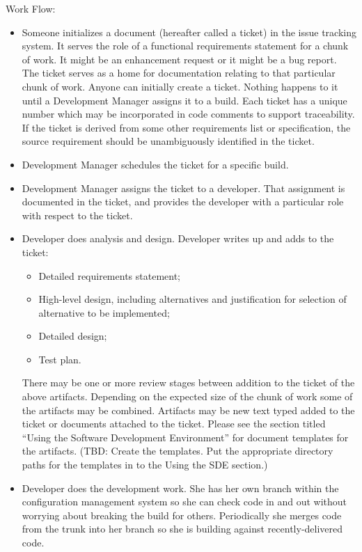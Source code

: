 Work Flow:
\begin{itemize}
\item
Someone initializes a document (hereafter called a ticket) in the 
issue tracking system.  It serves the role of a functional requirements 
statement for a chunk of work.  It might be an enhancement request or 
it might be a bug report.  The ticket serves as a home for 
documentation relating to that particular chunk of work.  Anyone can 
initially create a ticket.  Nothing happens to it until a 
Development Manager assigns it to a build.  Each ticket has a unique
number which may be incorporated in code comments to support 
traceability.  If the ticket is derived from some other requirements
list or specification, the source requirement should be unambiguously
identified in the ticket.
\item
Development Manager schedules the ticket for a specific build.
\item
Development Manager assigns the ticket to a developer.  That 
assignment is documented in the ticket, and provides the developer 
with a particular role with respect to the ticket.
\item
Developer does analysis and design.  Developer writes up and adds 
to the ticket:
\begin{itemize}
\item
Detailed requirements statement; 
\item
High-level design, including alternatives and justification for 
selection of alternative to be implemented; 
\item
Detailed design;
\item
Test plan.
\end{itemize}
There may be one or more review stages between addition to the 
ticket of the above artifacts.  Depending on the expected size 
of the chunk of work some of the artifacts may be combined.  
Artifacts may be new text typed added to the ticket or 
documents attached to the ticket.  Please see the section
titled ``Using the Software Development Environment'' for
document templates for the artifacts.  (TBD:  Create the
templates.  Put the appropriate directory paths for the
templates in to the Using the SDE section.)
\item
Developer does the development work.  She has her own branch 
within the configuration management system so she can check 
code in and out without worrying about breaking the build for 
others.  Periodically she merges code from the trunk into her 
branch so she is building against recently-delivered code.


\end{itemize}
